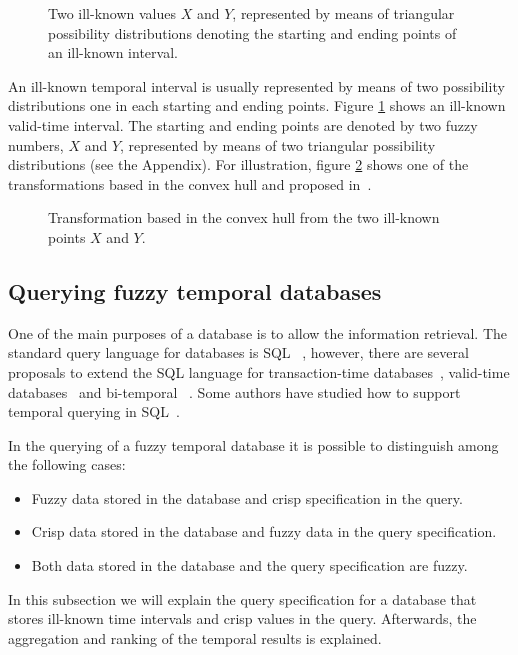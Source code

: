 \begin{figure}
\centering

\caption{Two ill-known values $X$ and $Y$, represented by means of triangular possibility distributions denoting the starting and ending points of an ill-known interval. }
\label{fig:interval}
\end{figure}


An ill-known temporal interval is usually represented by means of two possibility distributions one in each starting and ending points. Figure \ref{fig:interval} shows an ill-known valid-time interval. The starting and ending points are denoted by two fuzzy numbers, $X$ and $Y$, represented by means of two triangular possibility distributions (see the Appendix). For illustration, figure \ref{fig:convexhull} shows one of the transformations based in the convex hull and proposed in~\cite{garrido2009}.

\begin{figure}
\centering

\caption{Transformation based in the convex hull from the two ill-known points $X$ and $Y$. }
\label{fig:convexhull}
\end{figure}

\subsection{Querying fuzzy temporal databases}
\label{subsec:querying-time-intervals}
One of the main purposes of a database is to allow the information retrieval. The standard query language for databases is SQL ~\cite{Mel93}, however, there are several proposals to extend the SQL language for transaction-time databases~\cite{Sarda90}, valid-time databases~\cite{gad92} and bi-temporal ~\cite{TSQL}. Some authors have studied how to support temporal querying in SQL~\cite{Snodgrass98}.

In the querying of a fuzzy temporal database it is possible to distinguish among the following cases:

\begin{itemize}
\item
Fuzzy data stored in the database and crisp specification in the query.
\item
Crisp data stored in the database and fuzzy data in the query specification.
\item
Both data stored in the database and the query specification are fuzzy.
\end{itemize}
In this subsection we will explain the query specification for a database that stores ill-known time intervals and crisp values in the query. Afterwards, the aggregation and ranking of the temporal results is explained.

